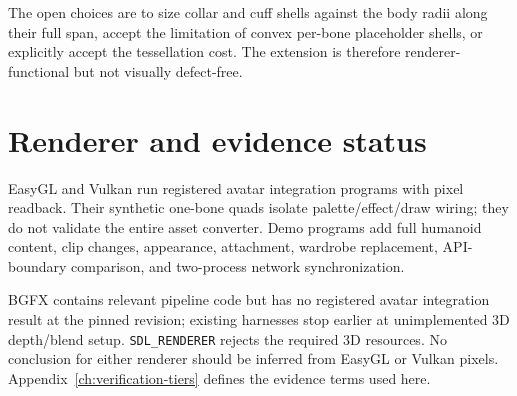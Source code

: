 The open choices are to size collar and cuff shells against the body radii along their full
span, accept the limitation of convex per-bone placeholder shells, or explicitly accept the
tessellation cost. The extension is therefore renderer-functional but not visually defect-free.

\section{Renderer and evidence status}

EasyGL and Vulkan run registered avatar integration programs with pixel readback. Their
synthetic one-bone quads isolate palette/effect/draw wiring; they do not validate the entire
asset converter. Demo programs add full humanoid content, clip changes, appearance, attachment,
wardrobe replacement, API-boundary comparison, and two-process network synchronization.

BGFX contains relevant pipeline code but has no registered avatar integration result at the
pinned revision; existing harnesses stop earlier at unimplemented 3D depth/blend setup.
\texttt{SDL\_RENDERER} rejects the required 3D resources. No conclusion for either renderer
should be inferred from EasyGL or Vulkan pixels. Appendix~\ref{ch:verification-tiers} defines
the evidence terms used here.
